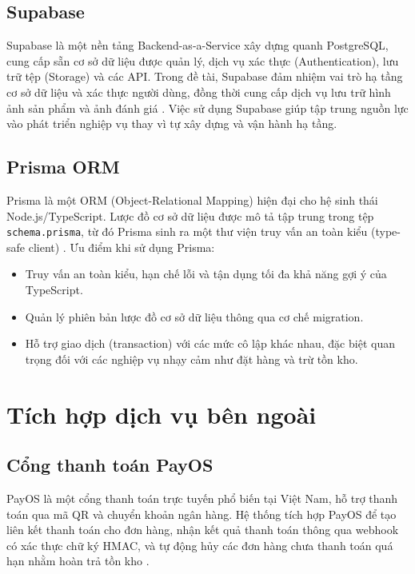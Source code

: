 \subsection{Supabase}

Supabase là một nền tảng Backend-as-a-Service xây dựng quanh PostgreSQL, cung cấp sẵn cơ sở
dữ liệu được quản lý, dịch vụ xác thực (Authentication), lưu trữ tệp (Storage) và các API. Trong
đề tài, Supabase đảm nhiệm vai trò hạ tầng cơ sở dữ liệu và xác thực người dùng, đồng thời cung
cấp dịch vụ lưu trữ hình ảnh sản phẩm và ảnh đánh giá \cite{supabase}. Việc sử dụng Supabase giúp
tập trung nguồn lực vào phát triển nghiệp vụ thay vì tự xây dựng và vận hành hạ tầng.

\subsection{Prisma ORM}

Prisma là một ORM (Object-Relational Mapping) hiện đại cho hệ sinh thái Node.js/TypeScript.
Lược đồ cơ sở dữ liệu được mô tả tập trung trong tệp \texttt{schema.prisma}, từ đó Prisma sinh ra
một thư viện truy vấn an toàn kiểu (type-safe client) \cite{prisma}. Ưu điểm khi sử dụng Prisma:

\begin{itemize}
  \item Truy vấn an toàn kiểu, hạn chế lỗi và tận dụng tối đa khả năng gợi ý của TypeScript.
  \item Quản lý phiên bản lược đồ cơ sở dữ liệu thông qua cơ chế migration.
  \item Hỗ trợ giao dịch (transaction) với các mức cô lập khác nhau, đặc biệt quan trọng đối với
  các nghiệp vụ nhạy cảm như đặt hàng và trừ tồn kho.
\end{itemize}

\section{Tích hợp dịch vụ bên ngoài}

\subsection{Cổng thanh toán PayOS}

PayOS là một cổng thanh toán trực tuyến phổ biến tại Việt Nam, hỗ trợ thanh toán qua mã QR và
chuyển khoản ngân hàng. Hệ thống tích hợp PayOS để tạo liên kết thanh toán cho đơn hàng, nhận
kết quả thanh toán thông qua webhook có xác thực chữ ký HMAC, và tự động hủy các đơn hàng
chưa thanh toán quá hạn nhằm hoàn trả tồn kho \cite{payos}.

